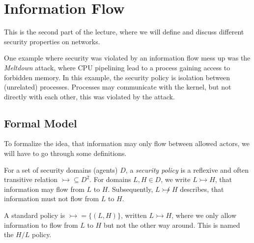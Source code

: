 \chapter{Information Flow}
This is the second part of the lecture, where we will define and discuss different security properties on networks.

One example where security was violated by an information flow mess up was the \emph{Meltdown} attack, where CPU pipelining lead to a process gaining access to forbidden memory.
In this example, the security policy is isolation between (unrelated) processes.
Processes may communicate with the kernel, but not directly with each other, this was violated by the attack.

\section{Formal Model}
To formalize the idea, that information may only flow between allowed actors, we will have to go through some definitions.

\begin{definition}
    For a set of security domains (agents) \(D\), a \emph{security policy} is a reflexive and often transitive relation \(\rightarrowtail \subseteq D^2\).
    For domains \(L, H \in D\), we write \(L \rightarrowtail H\), that information may flow from \(L\) to \(H\).
    Subsequently, \(L \not\rightarrowtail H\) describes, that information must not flow from \(L\) to \(H\).

    A standard policy is \(\rightarrowtail = \{(L, H)\}\), written \(L \rightarrowtail H\), where we only allow information to flow from \(L\) to \(H\) but not the other way around.
    This is named the \(H/L\) policy.
\end{definition}

\newcommand{\step}{\texttt{step}}
\newcommand{\obs}{\texttt{obs}}
\newcommand{\dom}{\texttt{dom}}

